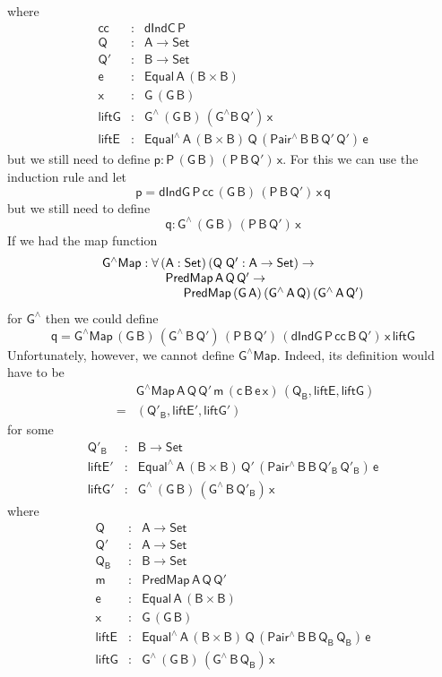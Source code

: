 \documentclass[sigplan,screen]{acmart}
\begin{document}
where
\[\begin{array}{lll}
\mathsf{cc} & : & \mathsf{dIndC\,P}\\
\mathsf{Q} & : & \mathsf{A \to Set}\\
\mathsf{Q'} & : & \mathsf{B \to Set}\\
\mathsf{e} & : & \mathsf{Equal\,A\,(B \times B)}\\
\mathsf{x} & : & \mathsf{G\,(G\,B)}\\
\mathsf{liftG} & : & \mathsf{G^{\wedge}\,(G\,B)\, (G^{\wedge}
  B\,Q')\,x}\\
\mathsf{liftE} & : & \mathsf{Equal^{\wedge}\,A\,(B \times 
  B)\,Q\,(Pair^{\wedge}\,B\,B\,Q'\,Q')\,e}
\end{array}\]
but we still need to
define $\mathsf{p : P\,(G\,B)\,(P\,B\,Q')\,x}$.  For this we can use
the induction rule and let
\[\mathsf{p = dIndG\,P\,cc\,(G\,B)\,(P\,B\,Q')\,x\,q}\] but we still
need to define \[\mathsf{q : G^{\wedge}\,(G\,B)\,(P\,B\,Q')\,x}\]  If
we had the map function
\[\begin{array}{l}
\mathsf{G^\wedge Map : \forall\, (A : Set)\,
  (Q\;Q' : A \to Set) \to}\\
\hspace*{0.7in}\mathsf{PredMap\,A\,Q\,Q' \to}\\
\hspace*{0.9in}\mathsf{PredMap\,(G\,A)\,(G^{\wedge}\,A\,Q)\,(G^{\wedge}\,A\,Q')} 
\end{array}\]
for $\mathsf{G^{\wedge}}$
then we could define
\[\mathsf{q = G^\wedge Map\,(G\,B)\,(G^{\wedge}\,B\,Q')\,(P\,B\,Q')\,
(dIndG\,P\,cc\,B\,Q')\,x\,liftG}\]  Unfortunately, however,
we cannot define $\mathsf{G^\wedge Map}$. Indeed, its definition would
have to be
\[\begin{array}{ll}
 & \!\!\mathsf{G^\wedge Map\,A\,Q\,Q'\,m\,(c\,B\,e\,x)\,(Q_B,
  liftE, liftG)}\\
\quad\quad= & \!\! \mathsf{(Q'_B, liftE', liftG')}
\end{array}\] for some
\[\begin{array}{lll}
\mathsf{Q'_B} & : & \mathsf{B \to Set}\\
\mathsf{liftE'} & :  & \mathsf{Equal^{\wedge}\,A\,(B \times
  B)\,Q'\,(Pair^{\wedge}\,B\,B\,Q'_B\,Q'_B)\,e}\\
\mathsf{liftG'} & : &
\mathsf{G^{\wedge}\,(G\,B)\,(G^{\wedge}\,B\,Q'_B)\,x}
\end{array}\]
where
\[\begin{array}{lll}
\mathsf{Q} & : & \mathsf{A \to Set}\\
\mathsf{Q'} & : & \mathsf{A \to Set}\\
\mathsf{Q_B} & : & \mathsf{B \to Set}\\
\mathsf{m} & : & \mathsf{PredMap\,A\,Q\,Q'}\\
\mathsf{e} & : & \mathsf{Equal\,A\,(B \times B)}\\
\mathsf{x} & : & \mathsf{G\,(G\,B)}\\
\mathsf{liftE} & : & \mathsf{Equal^{\wedge}\,A\,(B \times
  B)\,Q\,(Pair^{\wedge}\,B\,B\,Q_B\,Q_B)\,e}\\
\mathsf{liftG} & : &
\mathsf{G^{\wedge}\,(G\,B)\,(G^{\wedge}\,B\,Q_B)\,x}
\end{array}\]
\end{document}
